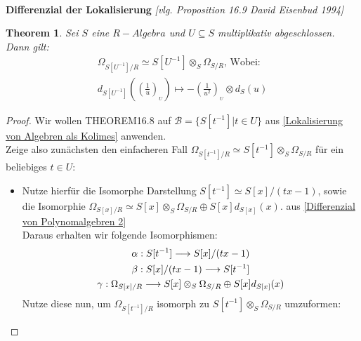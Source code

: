 \documentclass[10pt,a4paper]{report}
\newcommand{\comment}[1]{}
\newcommand{\ModulsOfDifferenzials}{David Eisenbud 1994}
\newcounter{Aussage}[chapter]
\newtheorem{theorem}[Aussage]{Theorem}
\newcommand{\functionfront}[3]{\nolinebreak{#1:#2 \longrightarrow #3}}
\newcommand{\divR}[2]{\Omega_{#1/#2}}
\newcommand{\divf}[1]{d_{#1}}
\newcommand{\Tensor}[3]{#1 \otimes_{#2} #3}
\newcommand{\tensor}[3]{#1 \otimes #3}
\newcommand{\lok}[2]{#1 [#2^{-1}]}
\newcommand{\loke}[3]{(\frac{#1}{#2})_{_{#3}}}
\begin{document}
\ \\
\textbf{Differenzial der Lokalisierung} \textit{[vlg. Proposition 16.9 \ModulsOfDifferenzials]}
\begin{theorem}\label{Differenzial der Lokalisierung}
Sei $S$ eine $R-Algebra$ und $U \subseteq S$ multiplikativ abgeschlossen.
Dann gilt:
\begin{gather*}
\divR{\lok{S}{U}}{R} \simeq \Tensor{\lok{S}{U}}{S}{\divR{S}{R}} \text{, Wobei:}\\
 \divf{\lok{S}{U}}(\loke{1}{u}{U}) \longmapsto -\tensor{\loke{1}{u^2}{U}}{S}{\divf{S}(u)}
\end{gather*}
\end{theorem}
\begin{proof}
Wir wollen THEOREM16.8 \comment{\label{THEOREM16.8}} auf $\mathcal{B} = \lbrace \lok{S}{t} \vert t \in U \rbrace$ aus \cref{Lokalisierung von Algebren als Kolimes} anwenden.\\
Zeige also zunächsten den einfacheren Fall $\divR{\lok{S}{t}}{R} \simeq \Tensor{\lok{S}{t}}{S}{\divR{S}{R}}$ für ein beliebiges $t \in U$:
\begin{itemize}
\item[]
Nutze hierfür die Isomorphe Darstellung $\lok{S}{t} \simeq S[x]/(tx -1)$, sowie die Isomorphie $\divR{S[x]}{R} \simeq \Tensor{S[x]}{S}{\divR{S}{R}} \oplus S[x]\divf{S[x]}(x)$. aus \cref{Differenzial von Polynomalgebren 2}\\
Daraus erhalten wir folgende Isomorphismen:
\begin{gather*}
\functionfront{\alpha}{\lok{S}{t}}{S[x]/(tx -1)} \\
\functionfront{\beta}{S[x]/(tx -1)}{\lok{S}{t}} \\
\functionfront{\gamma}{\divR{S[x]}{R}}{ \Tensor{S[x]}{S}{\divR{S}{R}} \oplus S[x]\divf{S[x]}(x) }
\end{gather*}
Nutze diese nun, um $\divR{\lok{S}{t}}{R}$ isomorph zu $\Tensor{\lok{S}{t}}{S}{\divR{S}{R}}$ umzuformen:
\begin{center}
\end{center}
\end{itemize}
\end{proof}
\end{document}
